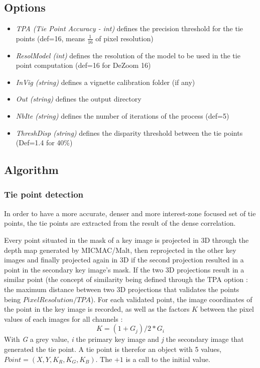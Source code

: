 \subsection{Options}
\begin{itemize}
\item{\textit{TPA (Tie Point Accuracy - int)} defines the precision threshold for the tie points (def=16, means $\frac{1}{16}$ of pixel resolution)}
\item{\textit{ResolModel (int)} defines the resolution of the model to be used in the tie point computation (def=16 for DeZoom 16)}
\item{\textit{InVig (string)} defines a vignette calibration folder (if any)}
\item{\textit{Out (string)} defines the output directory}
\item{\textit{NbIte (string)} defines the number of iterations of the process (def=5)}
\item{\textit{ThreshDisp (string)} defines the disparity threshold between the tie points (Def=1.4 for 40\%)}
\end{itemize}

\subsection{Algorithm}

\subsubsection{Tie point detection}

In order to have a more accurate, denser and more interest-zone focused set of tie points, the tie points are extracted from the result of the dense correlation.


 Every point situated in the mask of a key image is projected in 3D through the depth map generated by MICMAC/Malt, then reprojected in the other key images and finally projected again in 3D if the second projection resulted in a point in the secondary key image's mask. If the two 3D projections result in a similar point (the concept of similarity being defined through the TPA option : the maximum distance between two 3D projections that validates the points being $PixelResolution/TPA$). For each validated point, the image coordinates of the point in the key image is recorded, as well as the factors $K$ between the pixel values of each images for all channels : \[K=(1+G_{j})/2*G_{i}\]
 With \textit{G} a grey value, \textit{i} the primary key image and \textit{j} the secondary image that generated the tie point. A tie point is therefor an object with 5 values, $Point=(X,Y,K_{R},K_{G},K_{B})$. The $+1$ is a call to the initial value.

